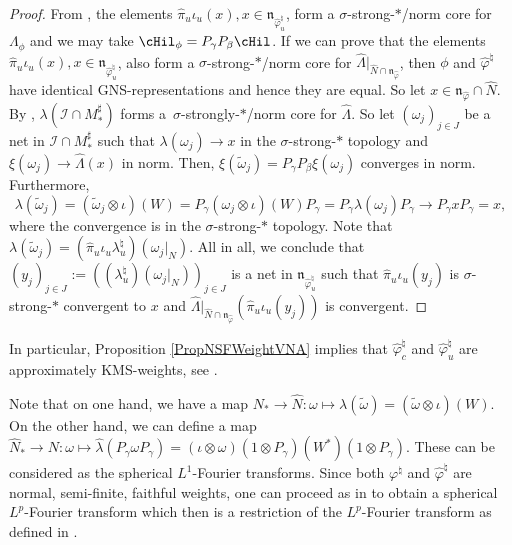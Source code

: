 \begin{proof}
 From \cite[Proposition 1.32]{KusVae}, the elements $\hat{\pi}_{u}  \iota_u(x), x \in \mathfrak{n}_{\hat{\varphi}_{u}^\natural}$, form a $\sigma$-strong-$\ast$/norm core for~$\Lambda_\phi$ and we may take $\cHil_\phi = P_\gamma P_\beta  \cHil$. If we can prove that    the elements $\hat{\pi}_{u}  \iota_u(x), x \in \mathfrak{n}_{\hat{\varphi}_{u}^\natural}$, also form a $\sigma$-strong-$\ast$/norm core for $\hat{\Lambda}\vert_{\hat{N} \cap \mathfrak{n}_{\hat{\varphi}}}$, then $\phi$ and $\hat{\varphi}^\natural$ have identical GNS-representations and hence they are equal. So let $x \in \mathfrak{n}_{\hat{\varphi}} \cap \hat{N}$. By \cite[Proposition~2.6]{KusVaeII}, $\lambda(\mathcal{I} \cap M_\ast^\sharp)$  forms a~$\sigma$-strongly-$\ast$/norm core for $\hat{\Lambda}$. So let $(\omega_j)_{j \in J}$ be a net in $\mathcal{I} \cap M_\ast^\sharp$  such that $\lambda(\omega_j) \rightarrow x$ in the $\sigma$-strong-$\ast$ topology and $\xi(\omega_j) \rightarrow \hat{\Lambda}(x)$ in norm. Then, $\xi(\tilde{\omega}_j) = P_\gamma P_\beta \xi(\omega_j)$ converges in norm. Furthermore,
\[
\lambda(\tilde{\omega}_j) = (\tilde{\omega}_j \otimes \iota)(W) = P_\gamma (\omega_j \otimes \iota)(W) P_\gamma = P_\gamma \lambda(\omega_j) P_\gamma \rightarrow P_\gamma x P_\gamma = x,
\]
where the convergence is in the $\sigma$-strong-$\ast$ topology. Note that $\lambda(\tilde{\omega}_j) = (\hat{\pi}_u \iota_u \lambda_u^\natural)(\omega_j\vert_N)$. All in all, we conclude that $(y_j)_{j \in J} := ((\lambda_u^\natural)(\omega_j\vert_N))_{j \in J}$ is a net in $ \mathfrak{n}_{\hat{\varphi}_{u}^\natural}$ such that $\hat{\pi}_{u}  \iota_u(y_j)$ is $\sigma$-strong-$\ast$ convergent to $x$ and $\hat{\Lambda}\vert_{\hat{N} \cap \mathfrak{n}_{\hat{\varphi}}}(\hat{\pi}_{u}  \iota_u(y_j))$ is convergent.
\end{proof}

\begin{rmk}
In particular, Proposition \ref{PropNSFWeightVNA} implies that $\hat{\varphi}_{c}^\natural$ and $\hat{\varphi}_{u}^\natural$ are approximately KMS-weights, see \cite[Proposition 1.35]{KusVae}.
\end{rmk}

\begin{rmk}
Note that on one hand, we have a map $N_\ast \rightarrow \hat{N}: \omega \mapsto \lambda(\tilde{\omega}) = (\tilde{\omega} \otimes \iota)(W)$. On the other hand, we can def\/ine a map $\hat{N}_\ast \rightarrow N: \omega \mapsto \hat{\lambda}(P_\gamma \omega P_\gamma) = (\iota \otimes \omega)(1\otimes P_\gamma)(W^\ast)(1\otimes P_\gamma)$. These can be considered as the spherical $L^1$-Fourier transforms. Since both $\varphi^\natural$ and $\hat{\varphi}^\natural$ are normal, semi-f\/inite, faithful weights, one can proceed as in \cite{Cas} to obtain a spherical $L^p$-Fourier transform which then is a restriction of the $L^p$-Fourier transform as def\/ined in \cite[Theorem 5.6]{Cas}.
\end{rmk}


